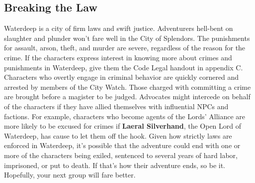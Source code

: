\documentclass[10pt,a4paper,twoside,twocolumn,openany,nodeprecatedcode]{dndbook}
\begin{document}
\subsection{Breaking the Law}
Waterdeep is a city of firm laws and swift justice. Adventurers hell-bent on slaughter and plunder won't fare well in the City of Splendors. The punishments for assault, arson, theft, and murder are severe, regardless of the reason for the crime.
If the characters express interest in knowing more about crimes and punishments in Waterdeep, give them the Code Legal handout in appendix C.
Characters who overtly engage in criminal behavior are quickly cornered and arrested by members of the City Watch. Those charged with committing a crime are brought before a magister to be judged. Advocates might intercede on behalf of the characters if they have allied themselves with influential NPCs and factions. For example, characters who become agents of the Lords' Alliance are more likely to be excused for crimes if \textbf{Laeral Silverhand}, the Open Lord of Waterdeep, has cause to let them off the hook.
Given how strictly laws are enforced in Waterdeep, it's possible that the adventure could end with one or more of the characters being exiled, sentenced to several years of hard labor, imprisoned, or put to death. If that's how their adventure ends, so be it. Hopefully, your next group will fare better.
\end{document}
